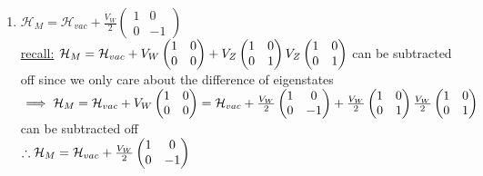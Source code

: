 \documentclass[12pt]{amsart}
\begin{document}
\begin{enumerate}
\item \underline{$\mathcal{H}_{M} =\mathcal{H}_{vac} + \frac{V_W}{2 } \begin{pmatrix} 1 & 0 \\ 0 & -1 \end{pmatrix}$}\\
\underline{recall:} $\mathcal{H}_M = \mathcal{H}_{vac} + V_W \begin{pmatrix} 1 & 0 \\ 0 & 0 \end{pmatrix} + V_Z \begin{pmatrix} 1 & 0 \\ 0 & 1 \end{pmatrix}\\
V_Z \begin{pmatrix} 1 & 0 \\ 0 & 1 \end{pmatrix}$ can be subtracted off since we only care about the difference of eigenstates\\
$\implies \mathcal{H}_M = \mathcal{H}_{vac} + V_W \begin{pmatrix} 1 & 0 \\ 0 & 0 \end{pmatrix} = \mathcal{H}_{vac} + \frac{V_W}{2} \begin{pmatrix} 1 & 0 \\ 0 & -1 \end{pmatrix} + \frac{V_W}{2} \begin{pmatrix} 1 & 0 \\ 0 & 1 \end{pmatrix}\\
\frac{V_W}{2} \begin{pmatrix} 1 & 0 \\ 0 & 1 \end{pmatrix}$ can be subtracted off\\
$\therefore \mathcal{H}_M = \mathcal{H}_{vac} + \frac{V_W}{2} \begin{pmatrix} 1 & 0 \\ 0 & -1 \end{pmatrix}\\$


\hdashrule[0.5ex][c]{\linewidth}{0.5pt}{1.5mm}



\end{enumerate}
\end{document}

